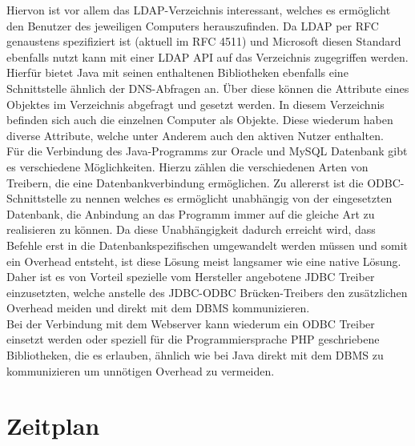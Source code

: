 Hiervon ist vor allem das LDAP-Verzeichnis interessant, welches es ermöglicht den Benutzer des jeweiligen Computers herauszufinden.
Da LDAP per RFC genaustens spezifiziert ist (aktuell im RFC 4511) und Microsoft diesen Standard ebenfalls nutzt kann mit einer LDAP API auf das Verzeichnis zugegriffen werden.\\
Hierfür bietet Java mit seinen enthaltenen Bibliotheken ebenfalls eine Schnittstelle ähnlich der DNS-Abfragen an. Über diese können die Attribute eines Objektes im Verzeichnis abgefragt und gesetzt werden. In diesem Verzeichnis befinden sich auch die einzelnen Computer als Objekte. Diese wiederum haben diverse Attribute, welche unter Anderem auch den aktiven Nutzer enthalten.\\
Für die Verbindung des Java-Programms zur Oracle und MySQL Datenbank gibt es verschiedene Möglichkeiten. Hierzu zählen die verschiedenen Arten von Treibern, die eine Datenbankverbindung ermöglichen. Zu allererst ist die ODBC-Schnittstelle zu nennen welches es ermöglicht unabhängig von der eingesetzten Datenbank, die Anbindung an das Programm immer auf die gleiche Art zu realisieren zu können. Da diese Unabhängigkeit dadurch erreicht wird, dass Befehle erst in die Datenbankspezifischen umgewandelt werden müssen und somit ein Overhead entsteht, ist diese Lösung meist langsamer wie eine native Lösung. Daher ist es von Vorteil spezielle vom Hersteller angebotene JDBC Treiber einzusetzten, welche anstelle des JDBC-ODBC Brücken-Treibers den zusätzlichen Overhead meiden und direkt mit dem DBMS kommunizieren.\\
Bei der Verbindung mit dem Webserver kann wiederum ein ODBC Treiber einsetzt werden oder speziell für die Programmiersprache PHP geschriebene Bibliotheken, die es erlauben, ähnlich wie bei Java direkt mit dem DBMS zu kommunizieren um unnötigen Overhead zu vermeiden.\\

\section{Zeitplan}
\label{sec:timetable}

